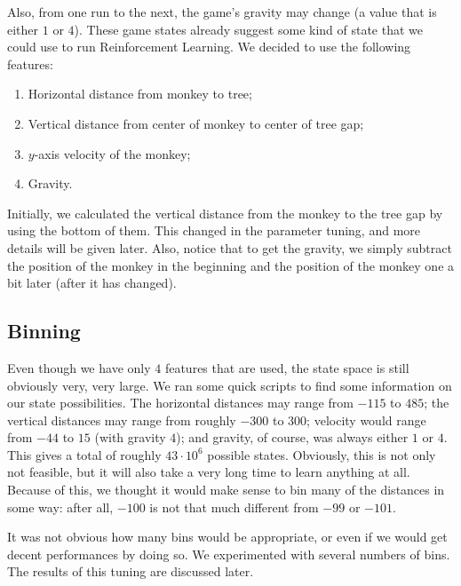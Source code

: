 \documentclass[10pt]{article}
\begin{document}
\medskip

Also, from one run to the next, the game's gravity may change (a value that
is either $1$ or $4$). These game states already suggest some kind of state
that we could use to run Reinforcement Learning. We decided to use the
following features:

\medskip

\begin{enumerate}
\item Horizontal distance from monkey to tree;
\item Vertical distance from center of monkey to center of tree gap;
\item $y$-axis velocity of the monkey;
\item Gravity.
\end{enumerate}

\medskip

Initially, we calculated the vertical distance from the monkey to the tree
gap by using the bottom of them. This changed in the parameter tuning, and
more details will be given later. Also, notice that to get the gravity,
we simply subtract the position of the monkey in the beginning and the
position of the monkey one a bit later (after it has changed). 

\subsection{Binning}

Even though we have only $4$ features that are used, the state space is still
obviously very, very large. We ran some quick scripts to find some information
on our state possibilities. The horizontal distances may range from $-115$
to $485$; the vertical distances may range from roughly $-300$ to $300$;
velocity would range from $-44$ to $15$ (with gravity $4$); and gravity,
of course, was always either $1$ or $4$. This gives a total of roughly 
$43 \cdot 10^6$ possible states. Obviously, this is not only not feasible,
but it will also take a very long time to learn anything at all. Because of 
this, we thought it would make sense to bin many of the distances in some
way: after all, $-100$ is not that much different from $-99$ or $-101$.

\medskip

It was not obvious how many bins would be appropriate, or even if we would get
decent performances by doing so. We experimented with several numbers of
bins. The results of this tuning are discussed later.
\end{document}
